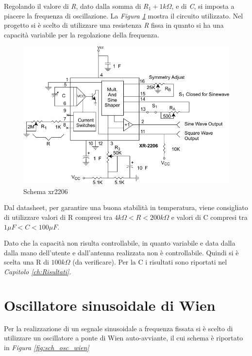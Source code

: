 \documentclass[titlepage]{report}
\begin{document}
	\noindent Regolando il valore di \textit{R}, dato dalla somma di $R_1 + 1k\Omega$, e di \textit{C}, si imposta a piacere la frequenza di oscillazione.
	La \textit{Figura \ref{fig:sch_xr2206_}} mostra il circuito utilizzato. Nel progetto si è scelto di utilizzare una resistenza \textit{R} fissa in quanto si ha una capacità variabile per la regolazione della frequenza.

	\begin{figure}[h]
		\centering
		\includegraphics[scale=1]{Immagini/schema_xr2206.pdf}
		\caption{Schema xr2206}
		\label{fig:sch_xr2206_}
	\end{figure}
	\newpage

	\noindent
	Dal datasheet, per garantire una buona stabilità in temperatura, viene consigliato di utilizzare valori di R compresi tra $4k\Omega < R < 200k\Omega$ e valori di C compresi tra $1\mu F < C < 100\mu F$.
	

	Dato che la capacità non risulta controllabile, in quanto variabile e data dalla dalla mano dell'utente e dall'antenna realizzata non è controllabile.
	Quindi si è scelta una R di $100k\Omega$ (da verificare). Per la C i risultati sono riportati nel \textit{Capitolo \ref{ch:Risultati}}.
	
\section{Oscillatore sinusoidale di Wien}
	\label{sec:osc_wien}
	Per la realizzazione di un segnale sinusoidale a frequenza fissata si è scelto di utilizzare un oscillatore a ponte di Wien auto-avviante, il cui schema è riportato in \textit{Figura \ref{fig:sch_osc_wien}}
	
\end{document}
